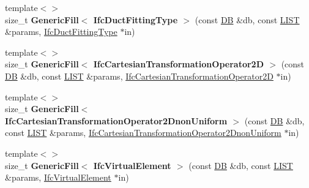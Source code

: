 \begin{DoxyCompactItemize}
\item 
\hypertarget{namespace_assimp_1_1_s_t_e_p_a16dee019c9245d062783634e1626858f}{{\footnotesize template$<$$>$ }\\size\+\_\+t {\bfseries Generic\+Fill$<$ Ifc\+Duct\+Fitting\+Type $>$} (const \hyperlink{class_assimp_1_1_s_t_e_p_1_1_d_b}{D\+B} \&db, const \hyperlink{class_assimp_1_1_s_t_e_p_1_1_e_x_p_r_e_s_s_1_1_l_i_s_t}{L\+I\+S\+T} \&params, \hyperlink{struct_assimp_1_1_i_f_c_1_1_ifc_duct_fitting_type}{Ifc\+Duct\+Fitting\+Type} $\ast$in)}\label{namespace_assimp_1_1_s_t_e_p_a16dee019c9245d062783634e1626858f}

\item 
\hypertarget{namespace_assimp_1_1_s_t_e_p_a8a58ecd1d951d00c5b193eebe0f56a2e}{{\footnotesize template$<$$>$ }\\size\+\_\+t {\bfseries Generic\+Fill$<$ Ifc\+Cartesian\+Transformation\+Operator2\+D $>$} (const \hyperlink{class_assimp_1_1_s_t_e_p_1_1_d_b}{D\+B} \&db, const \hyperlink{class_assimp_1_1_s_t_e_p_1_1_e_x_p_r_e_s_s_1_1_l_i_s_t}{L\+I\+S\+T} \&params, \hyperlink{struct_assimp_1_1_i_f_c_1_1_ifc_cartesian_transformation_operator2_d}{Ifc\+Cartesian\+Transformation\+Operator2\+D} $\ast$in)}\label{namespace_assimp_1_1_s_t_e_p_a8a58ecd1d951d00c5b193eebe0f56a2e}

\item 
\hypertarget{namespace_assimp_1_1_s_t_e_p_a826850b60f23cad1b87fb32434a0925b}{{\footnotesize template$<$$>$ }\\size\+\_\+t {\bfseries Generic\+Fill$<$ Ifc\+Cartesian\+Transformation\+Operator2\+Dnon\+Uniform $>$} (const \hyperlink{class_assimp_1_1_s_t_e_p_1_1_d_b}{D\+B} \&db, const \hyperlink{class_assimp_1_1_s_t_e_p_1_1_e_x_p_r_e_s_s_1_1_l_i_s_t}{L\+I\+S\+T} \&params, \hyperlink{struct_assimp_1_1_i_f_c_1_1_ifc_cartesian_transformation_operator2_dnon_uniform}{Ifc\+Cartesian\+Transformation\+Operator2\+Dnon\+Uniform} $\ast$in)}\label{namespace_assimp_1_1_s_t_e_p_a826850b60f23cad1b87fb32434a0925b}

\item 
\hypertarget{namespace_assimp_1_1_s_t_e_p_aaa00df562181ec855a19e482dbaa6f14}{{\footnotesize template$<$$>$ }\\size\+\_\+t {\bfseries Generic\+Fill$<$ Ifc\+Virtual\+Element $>$} (const \hyperlink{class_assimp_1_1_s_t_e_p_1_1_d_b}{D\+B} \&db, const \hyperlink{class_assimp_1_1_s_t_e_p_1_1_e_x_p_r_e_s_s_1_1_l_i_s_t}{L\+I\+S\+T} \&params, \hyperlink{struct_assimp_1_1_i_f_c_1_1_ifc_virtual_element}{Ifc\+Virtual\+Element} $\ast$in)}\label{namespace_assimp_1_1_s_t_e_p_aaa00df562181ec855a19e482dbaa6f14}


\end{DoxyCompactItemize}
